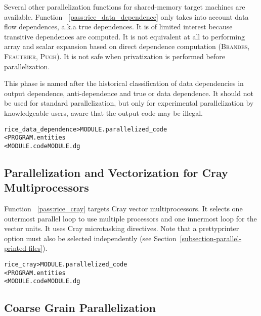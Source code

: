 \documentclass[a4paper]{report}
\newenvironment{PipsMake}{\begin{alltt}}{\end{alltt}}
\newcommand{\PipsPassRef}[1]{\texttt{\detokenize{#1}}~\ref{pass:#1}}
\newenvironment{PipsPass}[1]{\label{pass:#1}}{}
\begin{document}
\begin{PipsPass}{rice_data_dependence}
Several other parallelization functions for shared-memory target
machines are available. Function \PipsPassRef{rice_data_dependence} only takes into
account data flow dependences, a.k.a true dependences. It is of limited
interest because transitive dependences are computed. It is not
equivalent at all to performing array and scalar expansion based on direct
dependence computation (\textsc{Brandes}, \textsc{Feautrier}, \textsc{Pugh}).
It is not safe when privatization is performed before parallelization.

This phase is named after the historical classification of data
dependencies in output dependence, anti-dependence and true or data
dependence. It should not be used for standard parallelization, but
only for experimental parallelization by knowledgeable users, aware
that the output code may be illegal.
\end{PipsPass}

\begin{PipsMake}
rice_data_dependence            > MODULE.parallelized_code
        < PROGRAM.entities
        < MODULE.code MODULE.dg
\end{PipsMake}

\subsection{Parallelization and Vectorization for Cray Multiprocessors}

\begin{PipsPass}{rice_cray}
Function \PipsPassRef{rice_cray} targets Cray vector multiprocessors. It
selects one outermost parallel loop to use multiple processors and one
innermost loop for the vector units. It uses Cray microtasking
directives. Note that a prettyprinter option must also be selected independently (see
Section~\ref{subsection-parallel-printed-files}).
\end{PipsPass}

\begin{PipsMake}
rice_cray                   > MODULE.parallelized_code
        < PROGRAM.entities
        < MODULE.code MODULE.dg
\end{PipsMake}


\subsection{Coarse Grain Parallelization}
\label{subsubsection-coarse-grain-parallelization}
\end{document}
